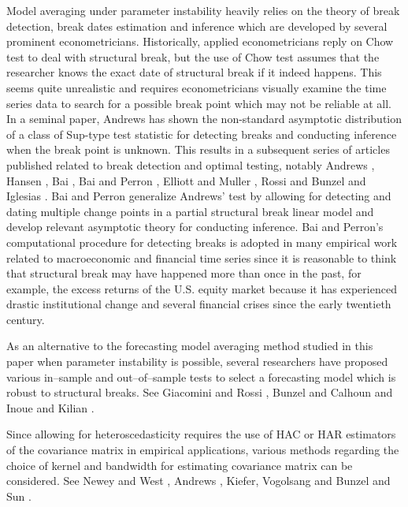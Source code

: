 \documentclass[a4paper,12pt]{article}
\begin{document}
Model averaging under parameter instability heavily relies on the theory of break detection, break dates estimation and inference which are developed by several prominent econometricians. Historically, applied econometricians reply on Chow test to deal with structural break, but the use of Chow test assumes that the researcher knows the exact date of structural break if it indeed happens. This seems quite unrealistic and requires econometricians visually examine the time series data to search for a possible break point which may not be reliable at all. In a seminal paper, Andrews \cite{andrews93} has shown the non-standard asymptotic distribution of a class of Sup-type test statistic for detecting breaks and conducting inference when the break point is unknown. This results in a subsequent series of articles published related to break detection and optimal testing, notably Andrews \cite{andrews_ploberger94} \cite{andrews2003}, Hansen \cite{hansen_JE2000}, Bai \cite{bai_ET1997} \cite{bai_JE1999}, Bai and Perron \cite{bai_perron98}, Elliott and Muller \cite{elliott_muller_RES2006}, Rossi \cite{rossi_ET2005} and Bunzel and Iglesias \cite{bunzel_iglesias}. Bai and Perron \cite{bai_perron98} generalize Andrews' test by allowing for detecting and dating multiple change points in a partial structural break linear model and develop relevant asymptotic theory for conducting inference. Bai and Perron's computational procedure for detecting breaks is adopted in many empirical work related to macroeconomic and financial time series since it is reasonable to think that structural break may have happened more than once in the past, for example, the excess returns of the U.S. equity market because it has experienced drastic institutional change and several financial crises since the early twentieth century.

As an alternative to the forecasting model averaging method studied in this paper when parameter instability is possible, several researchers have proposed various in--sample and out--of--sample tests to select a forecasting model which is robust to structural breaks. See Giacomini and Rossi \cite{giacomini_rossi_2008} \cite{giacomini_rossi_2010}, Bunzel and Calhoun \cite{bunzel_calhoun_2012} and Inoue and Kilian \cite{inoue_kilian_ER2004}.

Since allowing for heteroscedasticity requires the use of HAC or HAR estimators of the covariance matrix in empirical applications, various methods regarding the choice of kernel and bandwidth for estimating covariance matrix can be considered. See Newey and West \cite{newey_west_EMETRICA1987}, Andrews \cite{andrews91}, Kiefer, Vogolsang and Bunzel \cite{kvb2000} and Sun \cite{sunyixiao_2010}.
\end{document}
